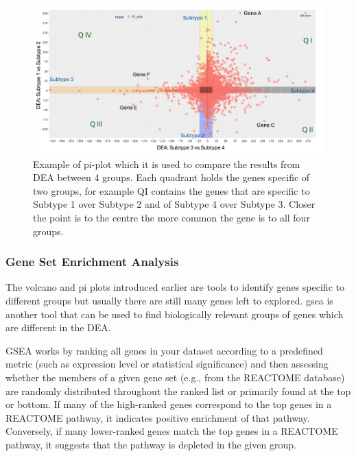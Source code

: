 \begin{figure}[!htb]    
    \centering
    \includegraphics[width=1.0\textwidth,height=1.0\textheight,keepaspectratio]{Sections/Lit_review/Resources/pi_explainer.png}
    \caption[Example - Pi plot]{Example of pi-plot which it is used to compare the results from DEA between 4 groups. Each quadrant holds the genes specific of two groups, for example QI contains the genes that are specific to  Subtype 1 over Subtype 2 and of Subtype 4 over Subtype 3. Closer the point is to the centre the more common the gene is to all four groups.}
    \label{fig:lit:pi_eg}
\end{figure}

\subsubsection{Gene Set Enrichment Analysis} \label{s:lit:gsea}

The volcano and pi plots introduced earlier are tools to identify genes specific to different groups but usually there are still many genes left to explored. \acrlong{gsea} is another tool that can be used to find biologically relevant groups of genes which are different in the DEA. 

GSEA works by ranking all genes in your dataset according to a predefined metric (such as expression level or statistical significance) and then assessing whether the members of a given gene set (e.g., from the REACTOME database) are randomly distributed throughout the ranked list or primarily found at the top or bottom. If many of the high-ranked genes correspond to the top genes in a REACTOME pathway, it indicates positive enrichment of that pathway. Conversely, if many lower-ranked genes match the top genes in a REACTOME pathway, it suggests that the pathway is depleted in the given group.


